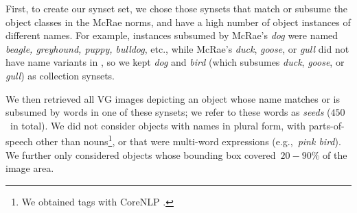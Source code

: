 First, to create our synset set, we chose those \vg synsets that match or subsume the object classes in the McRae norms, and have a high number of \vg object instances of different names.
For example, \vg instances subsumed by McRae's \textsl{dog} were named \textsl{beagle, greyhound, puppy, bulldog}, etc., while McRae's \textsl{duck}, \textsl{goose}, or \textsl{gull} did not have name variants in \vg, so we kept \textsl{dog} and \textsl{bird} (which subsumes \textsl{duck}, \textsl{goose}, or \textsl{gull}) as collection synsets.

We then retrieved all VG images depicting an object whose name matches or is subsumed by words in one of these synsets; we refer to these words as \textit{seeds} ($450$\ in total).
We did not consider objects with names in plural form, with parts-of-speech other than nouns\footnote{We obtained tags with CoreNLP \cite{manning2014stanford}.}, or that were multi-word expressions (e.g.,~\textsl{pink bird}). 
We further only considered objects whose bounding box covered~\mbox{$20-90\%$} of the image area.
